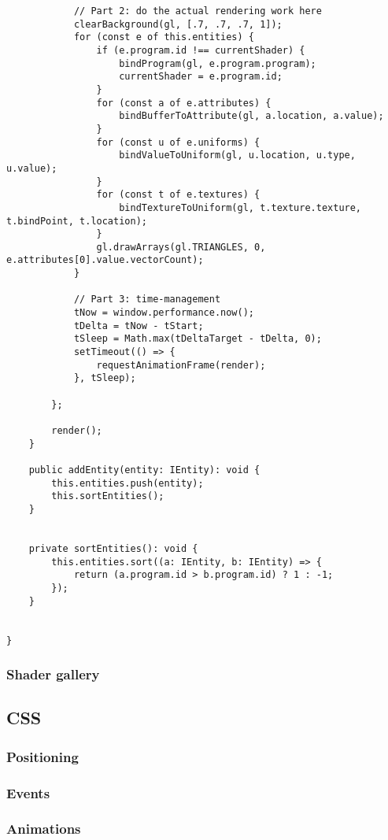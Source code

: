 \begin{lstlisting}
            // Part 2: do the actual rendering work here
            clearBackground(gl, [.7, .7, .7, 1]);
            for (const e of this.entities) {
                if (e.program.id !== currentShader) {
                    bindProgram(gl, e.program.program);
                    currentShader = e.program.id;
                }
                for (const a of e.attributes) {
                    bindBufferToAttribute(gl, a.location, a.value);
                }
                for (const u of e.uniforms) {
                    bindValueToUniform(gl, u.location, u.type, u.value);
                }
                for (const t of e.textures) {
                    bindTextureToUniform(gl, t.texture.texture, t.bindPoint, t.location);
                }
                gl.drawArrays(gl.TRIANGLES, 0, e.attributes[0].value.vectorCount);
            }

            // Part 3: time-management
            tNow = window.performance.now();
            tDelta = tNow - tStart;
            tSleep = Math.max(tDeltaTarget - tDelta, 0);
            setTimeout(() => {
                requestAnimationFrame(render);
            }, tSleep);

        };

        render();
    }

    public addEntity(entity: IEntity): void {
        this.entities.push(entity);
        this.sortEntities();
    }


    private sortEntities(): void {
        this.entities.sort((a: IEntity, b: IEntity) => {
            return (a.program.id > b.program.id) ? 1 : -1;
        });
    }


}
\end{lstlisting}

\subsubsection{Shader gallery}


\subsection{CSS}

\subsubsection{Positioning}
\subsubsection{Events}
\subsubsection{Animations}

